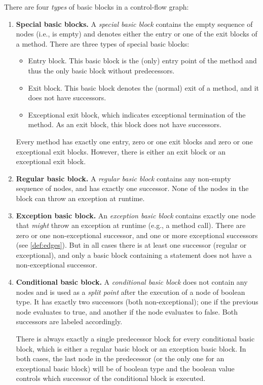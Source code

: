 \begin{definition}
    There are four \emph{types} of basic blocks in a control-flow graph:
    \begin{enumerate}
        \item \textbf{Special basic blocks.} A \emph{special basic block} contains
        the empty sequence of nodes (i.e., is empty) and denotes either the
        entry or one of the exit blocks of a method. There are three types
        of special basic blocks:
        \begin{itemize}
            \item Entry block. This basic block is the (only) entry point of the
            method and thus the only basic block without predecessors.
            \item Exit block. This basic block denotes the (normal) exit of
            a method, and it does not have successors.
            \item Exceptional exit block, which indicates exceptional termination
            of the method. As an exit block, this block does not have successors.
        \end{itemize}
        Every method has exactly one entry, zero or one exit blocks and zero or one
        exceptional exit blocks. However, there is either an exit block or an exceptional
        exit block.
        \item \textbf{Regular basic block.} A \emph{regular basic block} contains
        any non-empty sequence of nodes, and has exactly one successor.
        None of the nodes in the block can throw an exception at runtime.
        \item \textbf{Exception basic block.} An \emph{exception basic block} contains exactly
        one node that \emph{might} throw an exception at runtime (e.g., a method call).
        There are zero or one non-exceptional successor, and one
        or more exceptional successors (see \autoref{def:edges}). But in all cases there
        is at least one successor (regular or exceptional), and only a basic block
        containing a  statement does not have a non-exceptional successor.
        \item \textbf{Conditional basic block.} A \emph{conditional basic block}
        does not contain any nodes and is used as a \emph{split point} after the execution
        of a node of boolean type. It has exactly two successors (both non-exceptional); one
        if the previous node evaluates to true, and another
        if the node evaluates to false. Both successors are labeled accordingly.
        
        There is always exactly a single predecessor block for every conditional basic block, which
        is either a regular basic block or an exception basic block. In both cases, the last node
        in the predecessor (or the only one for an exceptional basic block) will be of boolean type
        and the boolean value controls which successor of the conditional block is executed.
    \end{enumerate}
\end{definition}

